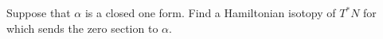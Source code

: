 

	Suppose that $\alpha$ is a closed one form. 
	Find a Hamiltonian isotopy of $T^*N$ for which sends the zero section to $\alpha$. 

